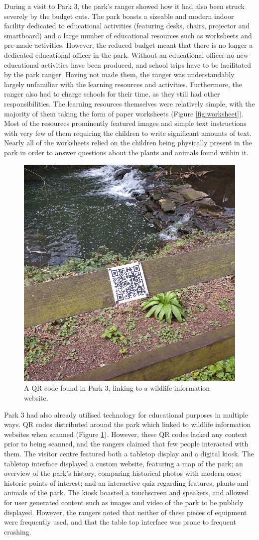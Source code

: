During a visit to Park 3, the park's ranger showed how it had also been struck severely by the budget cuts. The park boasts a sizeable and modern indoor facility dedicated to educational activities (featuring desks, chairs, projector and smartboard) and a large number of educational resources such as worksheets and pre-made activities. However, the reduced budget meant that there is no longer a dedicated educational officer in the park. Without an educational officer no new educational activities have been produced, and school trips have to be facilitated by the park ranger. Having not made them, the ranger was understandably largely unfamiliar with the learning resources and activities. Furthermore, the ranger also had to charge schools for their time, as they still had other responsibilities. The learning resources themselves were relatively simple, with the majority of them taking the form of paper worksheets (Figure \ref{fig:worksheet}). Most of the resources prominently featured images and simple text instructions with very few of them requiring the children to write significant amounts of text. Nearly all of the worksheets relied on the children being physically present in the park in order to answer questions about the plants and animals found within it.

\begin{figure}
  \centering
  \includegraphics[width=0.5\columnwidth]{images/chapter04/jesmondQR.jpg}
  \caption[An existing QR code in Park 3]{A QR code found in Park 3, linking to a wildlife information website.}
  \label{fig:jesmondQR}
\end{figure}

Park 3 had also already utilised technology for educational purposes in multiple ways. QR codes distributed around the park which linked to wildlife information websites when scanned (Figure \ref{fig:jesmondQR}). However, these QR codes lacked any context prior to being scanned, and the rangers claimed that few people interacted with them. The visitor centre featured both a tabletop display and a digital kiosk. The tabletop interface displayed a custom website, featuring a map of the park; an overview of the park's history, comparing historical photos with modern ones; historic points of interest; and an interactive quiz regarding features, plants and animals of the park. The kiosk boasted a touchscreen and speakers, and allowed for user generated content such as images and video of the park to be publicly displayed. However, the rangers noted that neither of these pieces of equipment were frequently used, and that the table top interface was prone to frequent crashing.

